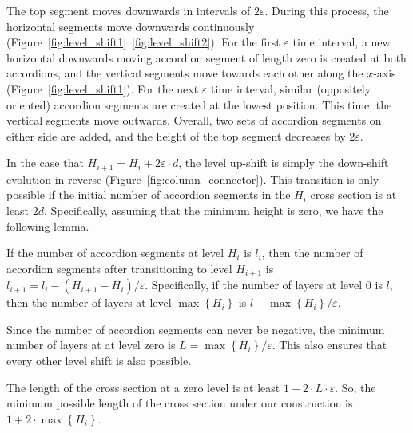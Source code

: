 The top segment moves downwards in intervals of $2\varepsilon$.
During this process, the horizontal segments move downwards continuously (Figure~\ref{fig:level_shift1}~\ref{fig:level_shift2}).
For the first $\varepsilon$ time interval, a new horizontal downwards moving accordion segment of length zero is created at both accordions,
and the vertical segments move towards each other along the $x$-axis (Figure~\ref{fig:level_shift1}).
For the next $\varepsilon$ time interval, similar (oppositely oriented) accordion segments are created at the lowest position.
This time, the vertical segments move outwards.
Overall, two sets of accordion segments on either side are added, and the height of the top segment decreases by $2\varepsilon$.

In the case that $H_{i+1} = H_i+2\varepsilon\cdot d$, the level up-shift is simply the down-shift evolution in reverse (Figure~\ref{fig:column_connector}).
This transition is only possible if the initial number of accordion segments in the $H_i$ cross section is at least $2d$.
Specifically, assuming that the minimum height is zero, we have the following lemma.
\begin{lemma}
\label{lem:layer_change}
If the number of accordion segments at level $H_i$ is $l_i$,
then the number of accordion segments after transitioning to level $H_{i+1}$ is $l_{i+1} = l_i - (H_{i+1}-H_i)/\varepsilon$.
Specifically, if the number of layers at level $0$ is $l$, then the number of layers
at level $\max\left\{ H_i\right\}$ is $l - \max\left\{ H_i\right\}/\varepsilon$.
\end{lemma}
\begin{corollary}
\label{cor:layer_limit}
Since the number of accordion segments can never be negative, the minimum number of layers at at level zero
is $L = \max\left\{ H_i\right\}/\varepsilon$. This also ensures that every other level shift is also possible.
\end{corollary}
\begin{corollary}
\label{cor:column_cross_section_length}
The length of the cross section at a zero level is at least $1 + 2\cdot L\cdot \varepsilon$.
So, the minimum possible length of the cross section under our construction is $1 + 2\cdot\max\left\{ H_i\right\}$.
\end{corollary}

